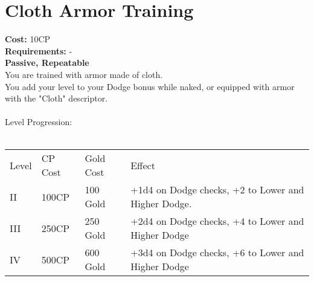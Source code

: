 \section{Cloth Armor Training}\label{perk:clothArmorTraining}
\textbf{Cost:} 10CP\\
\textbf{Requirements:} -\\
\textbf{Passive, Repeatable}\\
You are trained with armor made of cloth.\\
You add your level to your Dodge bonus while naked, or equipped with armor with the "Cloth" descriptor.\\
\\

Level Progression:\\
\\
\begin{tabular}{l | l | l | l}
	Level & CP Cost & Gold Cost & Effect\\
	II & 100CP & 100 Gold & +1d4 on Dodge checks, +2 to Lower and Higher Dodge.\\
	III & 250CP & 250 Gold & +2d4 on Dodge checks, +4 to Lower and Higher Dodge\\
	IV & 500CP & 600 Gold & +3d4 on Dodge checks, +6 to Lower and Higher Dodge\\
\end{tabular}